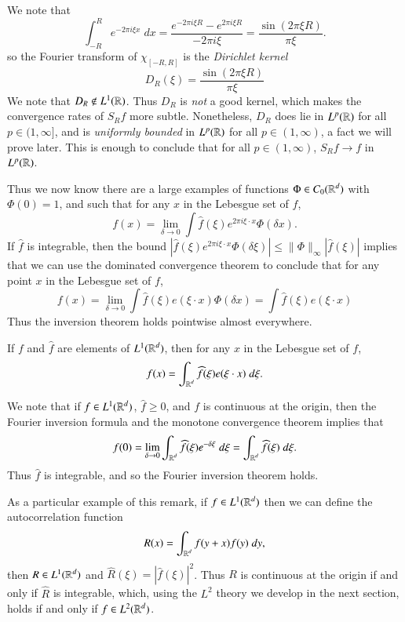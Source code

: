 \begin{example}
    We note that
    \[ \int_{-R}^R e^{- 2 \pi i \xi x}\; dx = \frac{e^{-2 \pi i \xi R} - e^{2 \pi i \xi R}}{-2 \pi i \xi} = \frac{\sin(2 \pi \xi R)}{\pi \xi}. \]
    so the Fourier transform of $\chi_{[-R,R]}$ is the \emph{Dirichlet kernel}
    \[ D_R(\xi) = \frac{\sin(2 \pi \xi R)}{\pi \xi} \]
    We note that $D_R \not \in L^1(\operatorname{\mathbb{R}})$. Thus $D_R$ is {\it not} a good kernel, which makes the convergence rates of $S_R f$ more subtle. Nonetheless, $D_R$ does lie in $L^p(\operatorname{\mathbb{R}})$ for all $p \in (1,\infty]$, and is \emph{uniformly bounded} in $L^p(\operatorname{\mathbb{R}})$ for all $p \in (1,\infty)$, a fact we will prove later.
    This is enough to conclude that for all $p \in (1,\infty)$, $S_R f \to f$ in $L^p(\operatorname{\mathbb{R}})$.
\end{example}

Thus we now know there are a large examples of functions $\Phi \in C_0(\operatorname{\mathbb{R}}^d)$ with $\Phi(0) = 1$, and such that for any $x$ in the Lebesgue set of $f$,
%
\[ f(x) = \lim_{\delta \to 0} \int \widehat{f}(\xi) e^{2 \pi i \xi \cdot x} \Phi(\delta x). \]
%
If $\widehat{f}$ is integrable, then the bound $| \widehat{f}(\xi) e^{2 \pi i \xi \cdot x} \Phi(\delta \xi) | \leq \| \Phi \|_\infty | \widehat{f}(\xi) |$ implies that we can use the dominated convergence theorem to conclude that for any point $x$ in the Lebesgue set of $f$,
%
\[ f(x) = \lim_{\delta \to 0} \int \widehat{f}(\xi) e(\xi \cdot x) \Phi(\delta x) = \int \widehat{f}(\xi) e(\xi \cdot x) \]
%
Thus the inversion theorem holds pointwise almost everywhere.

\begin{theorem}
    If $f$ and $\widehat{f}$ are elements of $L^1(\operatorname{\mathbb{R}}^d)$, then for any $x$ in the Lebesgue set of $f$,
    \[ f(x) = \int_{\operatorname{\mathbb{R}}^d} \widehat{f}(\xi) e(\xi \cdot x)\; d\xi. \]
\end{theorem}

\begin{remark}
    We note that if $f \in L^1(\operatorname{\mathbb{R}}^d)$, $\widehat{f} \geq 0$, and $f$ is continuous at the origin, then the Fourier inversion formula and the monotone convergence theorem implies that
    \[ f(0) = \lim_{\delta \to 0} \int_{\operatorname{\mathbb{R}}^d} \widehat{f}(\xi) e^{-\delta \xi}\; d\xi = \int_{\operatorname{\mathbb{R}}^d} \widehat{f}(\xi)\; d\xi. \]
    Thus $\widehat{f}$ is integrable, and so the Fourier inversion theorem holds.

    As a particular example of this remark, if $f \in L^1(\operatorname{\mathbb{R}}^d)$ then we can define the autocorrelation function
    \[ R(x) = \int_{\operatorname{\mathbb{R}}^d} f(y + x) f(y)\; dy, \]
    then $R \in L^1(\operatorname{\mathbb{R}}^d)$ and $\widehat{R}(\xi) = |\widehat{f}(\xi)|^2$. Thus $R$ is continuous at the origin if and only if $\widehat{R}$ is integrable, which, using the $L^2$ theory we develop in the next section, holds if and only if $f \in L^2(\operatorname{\mathbb{R}}^d)$.
\end{remark}

